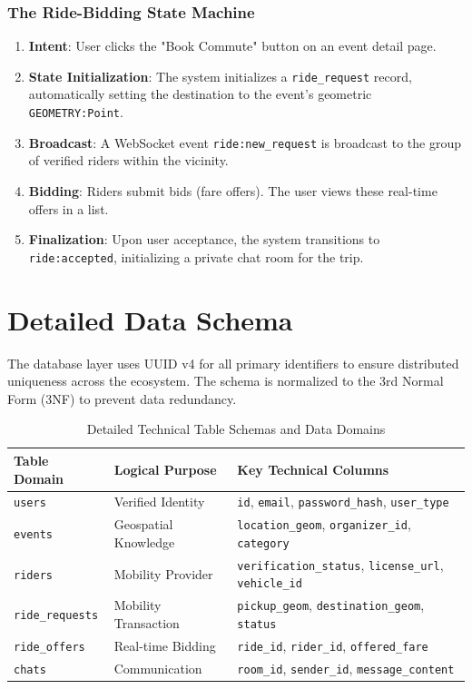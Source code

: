 \subsubsection{The Ride-Bidding State Machine}
\begin{enumerate}
    \item \textbf{Intent}: User clicks the "Book Commute" button on an event detail page.
    \item \textbf{State Initialization}: The system initializes a \texttt{ride\_request} record, automatically setting the destination to the event's geometric \texttt{GEOMETRY:Point}.
    \item \textbf{Broadcast}: A WebSocket event \texttt{ride:new\_request} is broadcast to the group of verified riders within the vicinity.
    \item \textbf{Bidding}: Riders submit bids (fare offers). The user views these real-time offers in a list.
    \item \textbf{Finalization}: Upon user acceptance, the system transitions to \texttt{ride:accepted}, initializing a private chat room for the trip.
\end{enumerate}

\section{Detailed Data Schema}
The database layer uses UUID v4 for all primary identifiers to ensure distributed uniqueness across the ecosystem. The schema is normalized to the 3rd Normal Form (3NF) to prevent data redundancy.

\begin{table}[H]
\centering
\caption{Detailed Technical Table Schemas and Data Domains}
\label{tab:db_detailed_schema}
\small
\begin{tabularx}{\textwidth}{@{}lXp{6cm}@{}}
\toprule
\textbf{Table Domain} & \textbf{Logical Purpose} & \textbf{Key Technical Columns} \\
\midrule
\texttt{users} & Verified Identity & \texttt{id}, \texttt{email}, \texttt{password\_hash}, \texttt{user\_type} \\
\texttt{events} & Geospatial Knowledge & \texttt{location\_geom}, \texttt{organizer\_id}, \texttt{category} \\
\texttt{riders} & Mobility Provider & \texttt{verification\_status}, \texttt{license\_url}, \texttt{vehicle\_id} \\
\texttt{ride\_requests} & Mobility Transaction & \texttt{pickup\_geom}, \texttt{destination\_geom}, \texttt{status} \\
\texttt{ride\_offers} & Real-time Bidding & \texttt{ride\_id}, \texttt{rider\_id}, \texttt{offered\_fare} \\
\texttt{chats} & Communication & \texttt{room\_id}, \texttt{sender\_id}, \texttt{message\_content} \\
\bottomrule
\end{tabularx}
\end{table}



